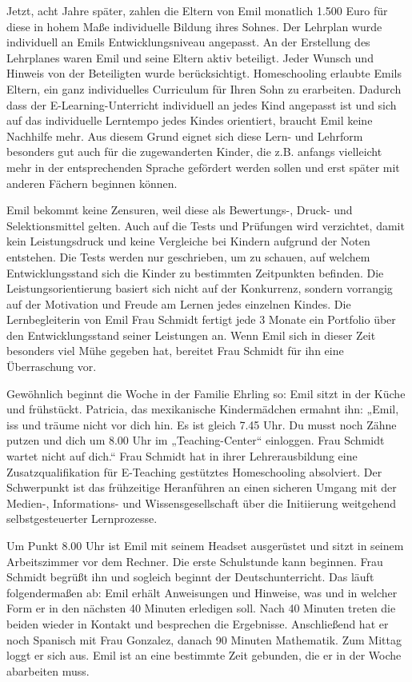 \documentclass[12pt,a4paper]{article}
\begin{document}
\begin{appendix}
Jetzt, acht Jahre später, zahlen die Eltern von Emil monatlich 1.500 Euro für diese in hohem Maße individuelle Bildung ihres Sohnes. Der Lehrplan wurde individuell an Emils Entwicklungsniveau angepasst. An der Erstellung des Lehrplanes waren Emil und seine Eltern aktiv beteiligt. Jeder Wunsch und Hinweis von der Beteiligten wurde berücksichtigt. Homeschooling erlaubte Emils Eltern, ein ganz individuelles Curriculum für Ihren Sohn zu erarbeiten. Dadurch dass der E-Learning-Unterricht individuell an jedes Kind angepasst ist und sich auf das individuelle Lerntempo jedes Kindes orientiert, braucht Emil keine Nachhilfe mehr. Aus diesem Grund eignet sich diese Lern- und Lehrform besonders gut auch für die zugewanderten Kinder, die z.B. anfangs vielleicht mehr in der entsprechenden Sprache gefördert werden sollen und erst später mit anderen Fächern beginnen können.

Emil bekommt keine Zensuren, weil diese als Bewertungs-, Druck- und Selektionsmittel gelten. Auch auf die Tests und Prüfungen wird verzichtet, damit kein Leistungsdruck und keine Vergleiche bei Kindern aufgrund der Noten entstehen. Die Tests werden nur geschrieben, um zu schauen, auf welchem Entwicklungsstand sich die Kinder zu bestimmten Zeitpunkten befinden. Die Leistungsorientierung basiert sich nicht auf der Konkurrenz, sondern vorrangig auf der Motivation und Freude am Lernen jedes einzelnen Kindes. Die Lernbegleiterin von Emil Frau Schmidt fertigt jede 3 Monate ein Portfolio über den Entwicklungsstand seiner Leistungen an. Wenn Emil sich in dieser Zeit besonders viel Mühe gegeben hat, bereitet Frau Schmidt für ihn eine Überraschung vor.

Gewöhnlich beginnt die Woche in der Familie Ehrling so: Emil sitzt in der Küche und frühstückt. Patricia, das mexikanische Kindermädchen ermahnt ihn: „Emil, iss und träume nicht vor dich hin. Es ist gleich 7.45 Uhr. Du musst noch Zähne putzen und dich um 8.00 Uhr im „Teaching-Center“ einloggen. Frau Schmidt wartet nicht auf dich.“
Frau Schmidt hat in ihrer Lehrerausbildung eine Zusatzqualifikation für E-Teaching gestütztes Homeschooling  absolviert. Der Schwerpunkt ist das frühzeitige Heranführen an einen sicheren Umgang mit der Medien-, Informations- und Wissensgesellschaft über die Initiierung weitgehend selbstgesteuerter Lernprozesse.

Um Punkt 8.00 Uhr ist Emil mit seinem Headset ausgerüstet und sitzt in seinem Arbeitszimmer vor dem Rechner. Die erste Schulstunde kann beginnen. Frau Schmidt begrüßt ihn und sogleich beginnt der Deutschunterricht. Das läuft folgendermaßen ab: Emil erhält Anweisungen und Hinweise, was und in welcher Form er in den nächsten 40 Minuten erledigen soll. Nach 40 Minuten treten die beiden wieder in Kontakt und besprechen die Ergebnisse. Anschließend hat er noch Spanisch mit Frau Gonzalez, danach 90 Minuten Mathematik. Zum Mittag loggt er sich aus. Emil ist an eine bestimmte Zeit gebunden, die er in der Woche abarbeiten muss.


\end{appendix}
\end{document}
